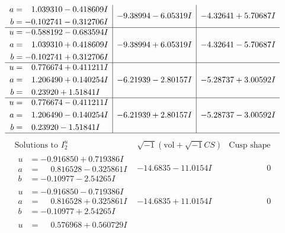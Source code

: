 \documentclass[1p]{elsarticle_modified}
\theoremstyle{definition}
\newcommand{\I}{\sqrt{-1}}
\begin{document}
$$\begin{array}{c|c|c}
\begin{aligned}
a &= \phantom{-}1.039310 - 0.418609 I \\
b &= -0.102741 - 0.312706 I\end{aligned}
 & -9.38994 - 6.05319 I & -4.32641 + 5.70687 I \\ \hline\begin{aligned}
u &= -0.588192 - 0.683594 I \\
a &= \phantom{-}1.039310 + 0.418609 I \\
b &= -0.102741 + 0.312706 I\end{aligned}
 & -9.38994 + 6.05319 I & -4.32641 - 5.70687 I \\ \hline\begin{aligned}
u &= \phantom{-}0.776674 + 0.411211 I \\
a &= \phantom{-}1.206490 + 0.140254 I \\
b &= \phantom{-}0.23920 + 1.51841 I\end{aligned}
 & -6.21939 - 2.80157 I & -5.28737 + 3.00592 I \\ \hline\begin{aligned}
u &= \phantom{-}0.776674 - 0.411211 I \\
a &= \phantom{-}1.206490 - 0.140254 I \\
b &= \phantom{-}0.23920 - 1.51841 I\end{aligned}
 & -6.21939 + 2.80157 I & -5.28737 - 3.00592 I\\
 \hline 
 \end{array}$$\newpage$$\begin{array}{c|c|c}  
\text{Solutions to }I^u_{2}& \I (\text{vol} + \sqrt{-1}CS) & \text{Cusp shape}\\
 \hline 
\begin{aligned}
u &= -0.916850 + 0.719386 I \\
a &= \phantom{-}0.816528 - 0.325861 I \\
b &= -0.10977 - 2.54265 I\end{aligned}
 & -14.6835 - 11.0154 I & \phantom{-0.000000 } 0 \\ \hline\begin{aligned}
u &= -0.916850 - 0.719386 I \\
a &= \phantom{-}0.816528 + 0.325861 I \\
b &= -0.10977 + 2.54265 I\end{aligned}
 & -14.6835 + 11.0154 I & \phantom{-0.000000 } 0 \\ \hline\begin{aligned}
u &= \phantom{-}0.576968 + 0.560729 I \\

\end{aligned}
\end{array}$$
\end{document}
